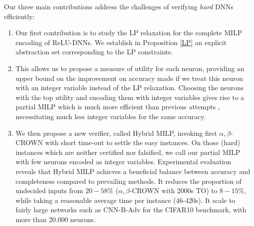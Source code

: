 Our three main contributions address the challenges of verifying {\em hard} DNNs efficiently:
\begin{enumerate}
	\item  Our first contribution is to study the LP relaxation for the complete MILP
	encoding of ReLU-DNNs. We establish in Proposition \ref{LP} an explicit abstraction set corresponding to the LP constraints.
	\item This allows us to propose a measure of utility for each neuron, providing an upper bound on the improvement on accuracy made if we treat this neuron with an integer variable instead of the LP relaxation. Choosing the neurons with the top utility and encoding them with integer variables gives rise to a partial MILP which is much more efficient than previous attempts \cite{9211410}, necessitating much less integer variables for the same accuracy.

\item We then propose a new verifier, called Hybrid MILP, invoking first 
$\alpha,\beta$-CROWN with short time-out to settle the easy instances. On those (hard) instances which are neither certified nor falsified, we call our partial MILP with few neurons encoded as integer variables. Experimental evaluation reveals that Hybrid MILP achieves a beneficial balance between accuracy and completeness compared to prevailing methods. It reduces the proportion of undecided inputs from $20-58\%$ ($\alpha,\beta$-CROWN with 2000s TO) to $8-15\%$, while taking a reasonable average time per instance (46-420s). It scale to fairly large networks such as CNN-B-Adv \cite{SDPFI} for the CIFAR10 benchmark, with more than 20.000 neurons.
\end{enumerate}

